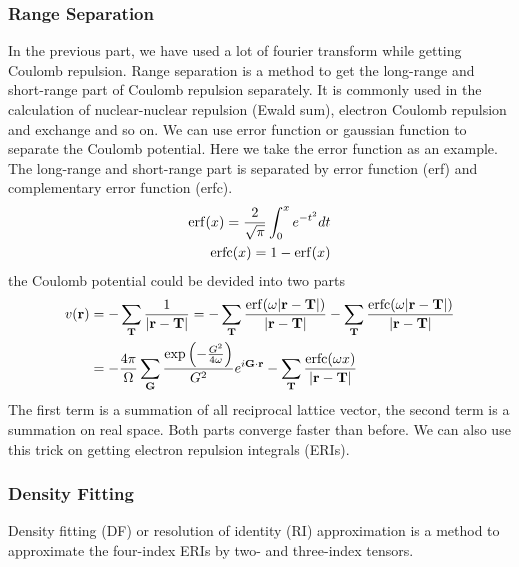 \documentclass{article}
\begin{document}
        \subsubsection{Range Separation}
            In the previous part, we have used a lot of fourier transform while getting Coulomb repulsion.
            Range separation\cite{sun2020exact,Ye2021} is a method to get the long-range and short-range part of Coulomb repulsion separately.
            It is commonly used in the calculation of nuclear-nuclear repulsion (Ewald sum), 
            electron Coulomb repulsion and exchange and so on.
            We can use error function\cite{Ye2021} or gaussian function\cite{SHIMAZAKI2016132} to separate the Coulomb potential.
            Here we take the error function as an example.
            The long-range and short-range part is separated by error function (erf) and complementary error function (erfc).
            \begin{align}
                {\rm erf}(x) = \frac{2}{\sqrt{\pi}}\int_{0}^{x}e^{-t^2}dt\\
                {\rm erfc}(x) = 1-{\rm erf}(x)
            \end{align}
            the Coulomb potential could be devided into two parts
            \begin{align}
                v(\textbf{r}) &= -\sum_{\textbf{T}}\frac{1}{|\textbf{r}-\textbf{T}|} = 
                -\sum_{\textbf{T}}\frac{{\rm erf}(\omega |\textbf{r}-\textbf{T}|)}{|\textbf{r}-\textbf{T}|} 
                -\sum_{\textbf{T}}\frac{{\rm erfc}(\omega |\textbf{r}-\textbf{T}|)}{|\textbf{r}-\textbf{T}|}\notag\\
                &= -\frac{4\pi}{\Omega}\sum_{\textbf{G}}\frac{\exp\left(-\frac{G^2}{4\omega}\right)}{G^2}e^{i\textbf{G}\cdot\textbf{r}} 
                -\sum_{\textbf{T}}\frac{{\rm erfc}(\omega x)}{|\textbf{r}-\textbf{T}|}
            \end{align} 
            The first term is a summation of all reciprocal lattice vector,
            the second term is a summation on real space.
            Both parts converge faster than before.
            We can also use this trick on getting electron repulsion integrals (ERIs).
            

        
        \subsubsection{Density Fitting}
            Density fitting (DF) or resolution of identity (RI) approximation is a method to approximate the four-index ERIs by two- and three-index tensors.
\end{document}
